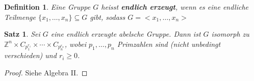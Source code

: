 \documentclass{article}
\theoremstyle{plain}
\newtheorem{definition}{Definition}
\newtheorem{theorem}{Satz}
\newcommand{\defn}[1]{\textbf{#1}}
\newcommand{\Z}{\mathbb{Z}}
\newcommand{\zykl}[1]{{<}{#1}{>}}
\begin{document}
\begin{definition}
    Eine Gruppe $G$ heisst \defn{endlich erzeugt}, wenn es eine endliche Teilmenge $\{x_1,\ldots,x_n\}\subseteq G$ gibt, sodass $G=\zykl{x_1,\ldots,x_n}$
\end{definition}

\begin{theorem}
    Sei $G$ eine endlich erzeugte abelsche Gruppe. Dann ist $G$ isomorph zu $\Z^n\times C_{p_1^{r_1}}\times\cdots\times C_{p_n^{r_n}}$, wobei $p_1, \ldots, p_n$ Primzahlen sind (nicht unbedingt verschieden) und $r_i\geq 0$.
\end{theorem}
\begin{proof}
    Siehe Algebra II.
\end{proof}
\end{document}
